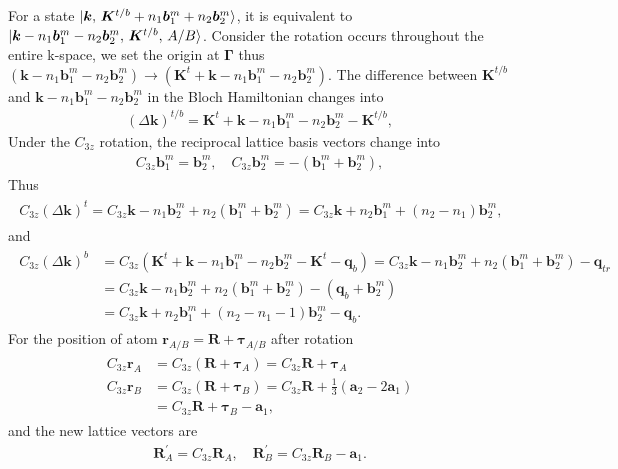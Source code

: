 \documentclass[10pt, oneside]{article}
\newcommand{\p}[1]{\left(#1\right)}
\begin{document}
For a state \(\ket{\bm{k}, \,\bm{K}^{t/b} + n_{1} \bm{b}^{m}_{1} + n_{2} \bm{b}^{m}_{2}}\), it is equivalent to \(\ket{\bm{k} - n_{1} \bm{b}^{m}_{1} - n_{2} \bm{b}^{m}_{2}, \, \bm{K}^{t/b},\, A/B}\). Consider the rotation occurs throughout the entire k-space, we set the origin at \(\bm{\Gamma}\) thus \(\p{\bm{k} - n_{1} \bm{b}^{m}_{1} - n_{2} \bm{b}^{m}_{2}} \rightarrow \p{\bm{K}^{t} + \bm{k} - n_{1} \bm{b}^{m}_{1} - n_{2}\bm{b}^{m}_{2}} \). The difference between \(\bm{K}^{t/b}\) and \(\bm{k} - n_{1} \bm{b}^{m}_{1} - n_{2}\bm{b}^{m}_{2}\) in the Bloch Hamiltonian changes into 
\begin{align}
	\p{\Delta \bm{k} }^{t/b} = \bm{K}^{t} + \bm{k} - n_{1} \bm{b}^{m}_{1} - n_{2}\bm{b}^{m}_{2} - \bm{K}^{t/b},
\end{align}
Under the \(C_{3z} \) rotation, the reciprocal lattice basis vectors change into 
\begin{align}
	C_{3z} \bm{b}^{m}_{1} = \bm{b}^{m}_{2}, \quad C_{3z} \bm{b}^{m}_{2} = - \p{ \bm{b}^{m}_{1} +  \bm{b}^{m}_{2}},
\end{align}
Thus 
\begin{align}
	\begin{split}
		C_{3z} \p{\Delta \bm{k} }^{t} = C_{3z} \bm{k} - n_{1} \bm{b}^{m}_{2} + n_{2} \p{ \bm{b}^{m}_{1} +  \bm{b}^{m}_{2}} = C_{3z} \bm{k} + n_{2} \bm{b}^{m}_{1} + \p{n_{2} - n_{1}}  \bm{b}^{m}_{2},
	\end{split}
\end{align}
and 
\begin{align}
	\begin{split}
		C_{3z} \p{\Delta \bm{k} }^{b} & = C_{3z} \p{\bm{K}^{t} + \bm{k} - n_{1} \bm{b}^{m}_{1} - n_{2}\bm{b}^{m}_{2} - \bm{K}^{t} - \bm{q}_{b}}  = C_{3z} \bm{k} - n_{1} \bm{b}^{m}_{2} + n_{2} \p{ \bm{b}^{m}_{1} +  \bm{b}^{m}_{2}} - \bm{q}_{tr} \\
		& = C_{3z} \bm{k} - n_{1} \bm{b}^{m}_{2} + n_{2} \p{ \bm{b}^{m}_{1} +  \bm{b}^{m}_{2}} - \p{\bm{q}_{b} + \bm{b}^{m}_{2}} \\
		& = C_{3z} \bm{k} + n_{2} \bm{b}^{m}_{1} + \p{n_{2} - n_{1} - 1}  \bm{b}^{m}_{2} - \bm{q}_{b}.
	\end{split}
\end{align}
For the position of atom \(\bm{r}_{A/B} = \bm{R} + \bm{\tau}_{A/B}\) after rotation
\begin{align}
	\begin{split}
		C_{3z} \bm{r}_{A} &= C_{3z} \p{\bm{R} + \bm{\tau}_{A}} = C_{3z} \bm{R} + \bm{\tau}_{A} \\
		C_{3z} \bm{r}_{B} &= C_{3z} \p{\bm{R} + \bm{\tau}_{B}} = C_{3z} \bm{R} + \frac{1}{3} \p{\bm{a}_{2} - 2 \bm{a}_{1}} \\
		& = C_{3z} \bm{R} + \bm{\tau}_{B} - \bm{a}_{1},
	\end{split}
\end{align}
and the new lattice vectors are
\begin{align}
		\bm{R}^{\prime}_{A} = C_{3z} \bm{R}_{A} ,\quad \bm{R}^{\prime}_{B} = C_{3z} \bm{R}_{B} - \bm{a}_{1}.
\end{align}
\end{document}
